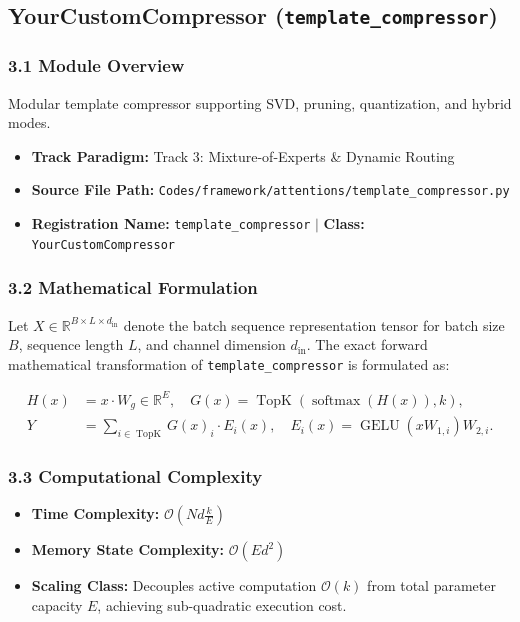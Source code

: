 \subsection{YourCustomCompressor (\texttt{template\_compressor})}
\label{sec:app_module_template_compressor}

\subsubsection*{3.1 Module Overview}
Modular template compressor supporting SVD, pruning, quantization, and hybrid modes.
\begin{itemize}
    \item \textbf{Track Paradigm:} Track 3: Mixture-of-Experts \& Dynamic Routing
    \item \textbf{Source File Path:} \texttt{Codes/framework/attentions/template\_compressor.py}
    \item \textbf{Registration Name:} \texttt{template\_compressor} $\mid$ \textbf{Class:} \texttt{YourCustomCompressor}
\end{itemize}

\subsubsection*{3.2 Mathematical Formulation}
Let $X \in \mathbb{R}^{B \times L \times d_{\text{in}}}$ denote the batch sequence representation tensor for batch size $B$, sequence length $L$, and channel dimension $d_{\text{in}}$. The exact forward mathematical transformation of \texttt{template\_compressor} is formulated as:

\begin{align}
H(x) &= x \cdot W_g \in \mathbb{R}^{E}, \quad G(x) = \operatorname{TopK}\left(\operatorname{softmax}(H(x)), k\right), \\
Y &= \sum_{i \in \operatorname{TopK}} G(x)_i \cdot E_i(x), \quad E_i(x) = \operatorname{GELU}(x W_{1, i}) W_{2, i}.
\end{align}


\subsubsection*{3.3 Computational Complexity}
\begin{itemize}
    \item \textbf{Time Complexity:} $\mathcal{O}(N d \frac{k}{E})$
    \item \textbf{Memory State Complexity:} $\mathcal{O}(E d^2)$
    \item \textbf{Scaling Class:} Decouples active computation $\mathcal{O}(k)$ from total parameter capacity $E$, achieving sub-quadratic execution cost.
\end{itemize}

